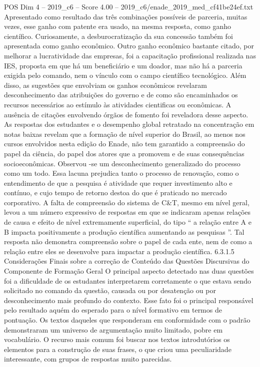 \begin{textsample}{POS Dim 4 – 2019\_c6 – Score 4.00 – 2019\_c6/enade\_2019\_med\_cf41be24ef.txt}
Apresentado como resultado das três combinações possíveis de parceria, muitas vezes, esse ganho com patente era usado, na mesma resposta, como ganho científico.
Curiosamente, a desburocratização da sua concessão também foi apresentada como ganho econômico.
Outro ganho econômico bastante citado, por melhorar a lucratividade das empresas, foi a capacitação profissional realizada nas IES, proposta em que há um beneficiário e um doador, mas não há a parceria exigida pelo comando, nem o vínculo com o campo científico tecnológico.
Além disso, as sugestões que envolviam os ganhos econômicos revelaram desconhecimento das atribuições do governo e de como são encaminhados os recursos necessários ao estímulo às atividades cientificas ou econômicas.
A ausência de citações envolvendo órgãos de fomento foi reveladora desse aspecto.
As respostas dos estudantes e o desempenho global retratado na concentração em notas baixas revelam que a formação de nível superior do Brasil, ao menos nos cursos envolvidos nesta edição do Enade, não tem garantido a compreensão do papel da ciência, do papel dos atores que a promovem e de suas consequências socioeconômicas.
Observou -se um desconhecimento generalizado do processo como um todo.
Essa lacuna prejudica tanto o processo de renovação, como o entendimento de que a pesquisa é atividade que requer investimento alto e contínuo, e cujo tempo de retorno destoa do que é praticado no mercado corporativo.
A falta de compreensão do sistema de C\&T, mesmo em nível geral, levou a um número expressivo de respostas em que se indicaram apenas relações de causa e efeito de nível extremamente superficial, do tipo “ a relação entre A e B impacta positivamente a produção científica aumentando as pesquisas ”.
Tal resposta não demonstra compreensão sobre o papel de cada ente, nem de como a relação entre eles se desenvolve para impactar a produção científica. 6.3.1.5 Considerações Finais sobre a correção de Conteúdo das Questões Discursivas do Componente de Formação Geral O principal aspecto detectado nas duas questões foi a dificuldade de os estudantes interpretarem corretamente o que estava sendo solicitado no comando da questão, causada ou por desatenção ou por desconhecimento mais profundo do contexto.
Esse fato foi o principal responsável pelo resultado aquém do esperado para o nível formativo em termos de pontuação.
Os textos daqueles que responderam em conformidade com o padrão demonstraram um universo de argumentação muito limitado, pobre em vocabulário.
O recurso mais comum foi buscar nos textos introdutórios os elementos para a construção de suas frases, o que criou uma peculiaridade interessante, com grupos de respostas muito parecidas.

\end{textsample}
